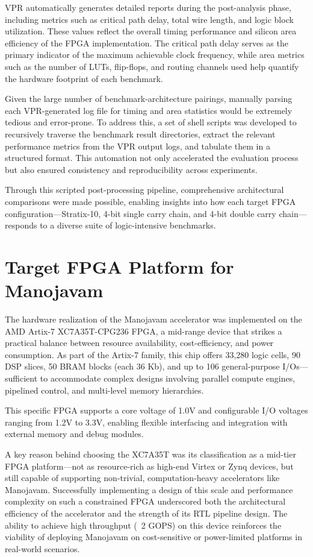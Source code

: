 VPR automatically generates detailed reports during the post-analysis phase, including metrics such as critical path delay, total wire length, and logic block utilization. These values reflect the overall timing performance and silicon area efficiency of the FPGA implementation. The critical path delay serves as the primary indicator of the maximum achievable clock frequency, while area metrics such as the number of LUTs, flip-flops, and routing channels used help quantify the hardware footprint of each benchmark.

Given the large number of benchmark-architecture pairings, manually parsing each VPR-generated log file for timing and area statistics would be extremely tedious and error-prone. To address this, a set of shell scripts was developed to recursively traverse the benchmark result directories, extract the relevant performance metrics from the VPR output logs, and tabulate them in a structured format. This automation not only accelerated the evaluation process but also ensured consistency and reproducibility across experiments.

Through this scripted post-processing pipeline, comprehensive architectural comparisons were made possible, enabling insights into how each target FPGA configuration—Stratix-10, 4-bit single carry chain, and 4-bit double carry chain—responds to a diverse suite of logic-intensive benchmarks.

\section{Target FPGA Platform for Manojavam}
The hardware realization of the Manojavam accelerator was implemented on the AMD Artix-7 XC7A35T-CPG236 FPGA, a mid-range device that strikes a practical balance between resource availability, cost-efficiency, and power consumption. As part of the Artix-7 family, this chip offers 33,280 logic cells, 90 DSP slices, 50 BRAM blocks (each 36 Kb), and up to 106 general-purpose I/Os—sufficient to accommodate complex designs involving parallel compute engines, pipelined control, and multi-level memory hierarchies\cite{chap4-1}.

This specific FPGA supports a core voltage of 1.0V and configurable I/O voltages ranging from 1.2V to 3.3V, enabling flexible interfacing and integration with external memory and debug modules.

A key reason behind choosing the XC7A35T was its classification as a mid-tier FPGA platform—not as resource-rich as high-end Virtex or Zynq devices, but still capable of supporting non-trivial, computation-heavy accelerators like Manojavam. Successfully implementing a design of this scale and performance complexity on such a constrained FPGA underscored both the architectural efficiency of the accelerator and the strength of its RTL pipeline design. The ability to achieve high throughput (~2 GOPS) on this device reinforces the viability of deploying Manojavam on cost-sensitive or power-limited platforms in real-world scenarios.

